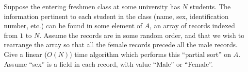 Suppose the entering freshmen class at some university has $N$
students.  The information pertinent to each student in the class
(name, sex, identification number, etc.) can be found in some element
of $A$, an array of records indexed from $1$ to $N$.  Assume the
records are in some random order, and that we wish to rearrange the
array so that all the female records precede all the male records.
Give a linear ($O(N)$) time algorithm  which performs this ``partial
sort'' on $A$.  Assume ``sex'' is a field in each record,  with
value ``Male'' or ``Female''.
